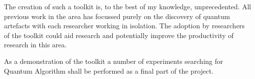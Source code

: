 The creation of such a toolkit is, to the best of my knowledge, unprecedented.
All previous work in the area has focussed purely on the discovery of quantum artefacts with each researcher working in isolation.
The adoption by researchers of the toolkit could aid research and potentially improve the productivity of research in this area.

As a demonstration of the toolkit a number of experiments searching for Quantum Algorithm shall be performed as a final part of the project.




